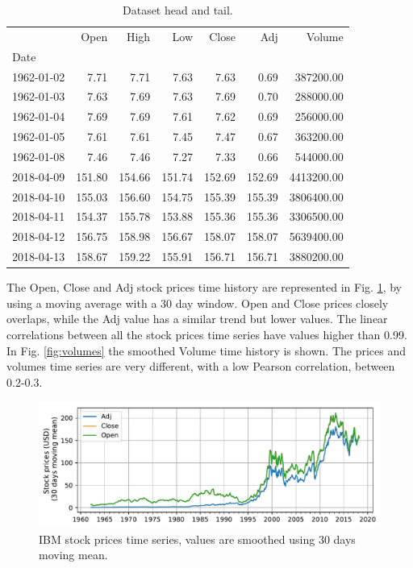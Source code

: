 \documentclass[a4paper,11pt,final]{article}
\begin{document}
\begin{table}[htbp]
  \centering


\begin{tabular}{lrrrrrr}
\toprule
{} &   Open &   High &    Low &  Close &    Adj &     Volume \\
Date       &        &        &        &        &        &            \\
\midrule
1962-01-02 &   7.71 &   7.71 &   7.63 &   7.63 &   0.69 &  387200.00 \\
1962-01-03 &   7.63 &   7.69 &   7.63 &   7.69 &   0.70 &  288000.00 \\
1962-01-04 &   7.69 &   7.69 &   7.61 &   7.62 &   0.69 &  256000.00 \\
1962-01-05 &   7.61 &   7.61 &   7.45 &   7.47 &   0.67 &  363200.00 \\
1962-01-08 &   7.46 &   7.46 &   7.27 &   7.33 &   0.66 &  544000.00 \\
2018-04-09 & 151.80 & 154.66 & 151.74 & 152.69 & 152.69 & 4413200.00 \\
2018-04-10 & 155.03 & 156.60 & 154.75 & 155.39 & 155.39 & 3806400.00 \\
2018-04-11 & 154.37 & 155.78 & 153.88 & 155.36 & 155.36 & 3306500.00 \\
2018-04-12 & 156.75 & 158.98 & 156.67 & 158.07 & 158.07 & 5639400.00 \\
2018-04-13 & 158.67 & 159.22 & 155.91 & 156.71 & 156.71 & 3880200.00 \\
\bottomrule
\end{tabular}


\caption{Dataset head and tail.}
\end{table}

The Open, Close and Adj stock prices time history are represented in Fig. \ref{fig:timeseries}, by using a moving average with a 30 day window.
Open and Close prices closely overlaps, while the Adj value has a similar trend but lower values. The linear correlations between all the stock prices time series have values higher than 0.99.
In Fig. \ref{fig:volumes} the smoothed Volume time history is shown. 
The prices and volumes time series are very different, with a low Pearson correlation, between 0.2-0.3.


\begin{figure}[htpb]
\center
\includegraphics[width= \linewidth]{figures/report_timeseries_1.pdf}
\caption{IBM stock prices time series, values are smoothed using 30 days moving mean.}
\label{fig:timeseries}
\end{figure}
\end{document}

